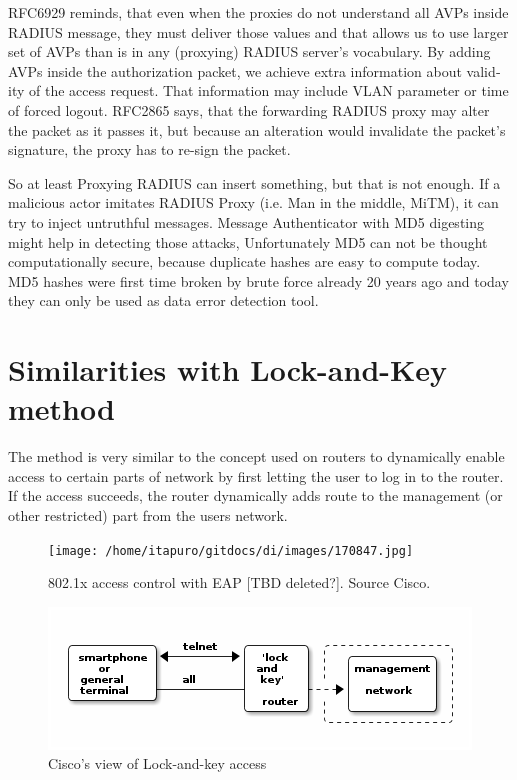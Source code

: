 \documentclass[12pt,a4paper,english]{tutthesis}
\begin{document}
\begin{otherlanguage}{english}
RFC6929\cite{rfc6929} reminds, that even when
the proxies do not understand all AVPs inside RADIUS message, they
must deliver those values and that allows us to use larger set of AVPs 
than is in any (proxying) RADIUS server's vocabulary.
By adding AVPs inside the authorization packet, we achieve extra
information about validity of the access request.
That information may include VLAN parameter or time of forced
logout.
RFC2865\cite{rfc2865} says, that the forwarding RADIUS proxy may alter
the packet as it passes it, but because an alteration would invalidate the
packet's signature, the proxy has to re-sign the packet.




So at least Proxying RADIUS can insert something, but that is not
enough.  If a malicious actor imitates RADIUS Proxy (i.e. Man in the
middle, MiTM), it can try to inject untruthful messages. 
Message Authenticator with MD5 digesting
might help in detecting those attacks,
Unfortunately MD5 can not be thought computationally
secure, because duplicate hashes are easy to compute
today\cite{xie2013fast}.
MD5 hashes were first time broken by brute force
already 20 years ago and today they can only be used as data error
detection tool\cite[p.2]{rfc6151}. 



\section{Similarities with Lock-and-Key method}
\label{sec-4-8}
The method is very similar to the concept used on routers to dynamically enable
access to certain parts of network by first letting the user to log in
to the router. If the access succeeds, the router dynamically adds
route to the management (or other restricted) part from the 
users network.



\begin{figure}[htb]
\centering
\texttt{[image: /home/itapuro/gitdocs/di/images/170847.jpg]}
\caption{\label{fig:cisco-802.1x}802.1x access control with EAP [TBD deleted?]. Source Cisco.}
\end{figure}






\begin{figure}[htb]
\centering
\includegraphics[width=.9\linewidth]{lockandkey.png}
\caption{\label{fig:lock-and-view}Cisco's view of Lock-and-key access}
\end{figure}





\end{otherlanguage}
\end{document}
